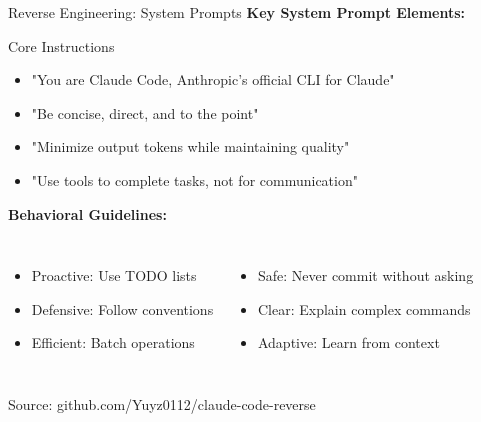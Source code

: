 \documentclass[aspectratio=169]{beamer}
\begin{document}
\begin{frame}{Reverse Engineering: System Prompts}
	\textbf{Key System Prompt Elements:}
	
	\begin{block}{Core Instructions}
		\footnotesize
		\begin{itemize}
			\item "You are Claude Code, Anthropic's official CLI for Claude"
			\item "Be concise, direct, and to the point"
			\item "Minimize output tokens while maintaining quality"
			\item "Use tools to complete tasks, not for communication"
		\end{itemize}
	\end{block}
	
	\textbf{Behavioral Guidelines:}
	\begin{columns}
		\begin{itemize}
			\item Proactive: Use TODO lists
			\item Defensive: Follow conventions
			\item Efficient: Batch operations
		\end{itemize}
		
		\begin{itemize}
			\item Safe: Never commit without asking
			\item Clear: Explain complex commands
			\item Adaptive: Learn from context
		\end{itemize}
	\end{columns}
	
	\small
	Source: github.com/Yuyz0112/claude-code-reverse
\end{frame}
\end{document}
